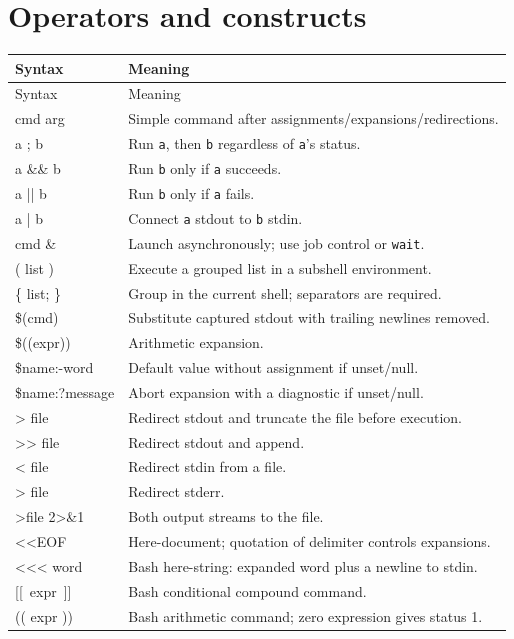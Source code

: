 \documentclass[11pt,oneside,openany]{book}
\begin{document}
\section{Operators and constructs}
\begin{longtable}{>{\ttfamily}p{}p{}}
\toprule
Syntax & Meaning \\
\midrule
\endfirsthead\toprule Syntax & Meaning \\
\midrule\endhead
cmd arg & Simple command after assignments/expansions/redirections. \\
a ; b & Run \texttt{a}, then \texttt{b} regardless of \texttt{a}'s status. \\
a \&\& b & Run \texttt{b} only if \texttt{a} succeeds. \\
a || b & Run \texttt{b} only if \texttt{a} fails. \\
a | b & Connect \texttt{a} stdout to \texttt{b} stdin. \\
cmd \& & Launch asynchronously; use job control or \texttt{wait}. \\
( list ) & Execute a grouped list in a subshell environment. \\
\{ list; \} & Group in the current shell; separators are required. \\
\$(cmd) & Substitute captured stdout with trailing newlines removed. \\
\$((expr)) & Arithmetic expansion. \\
\${name:-word} & Default value without assignment if unset/null. \\
\${name:?message} & Abort expansion with a diagnostic if unset/null. \\
> file & Redirect stdout and truncate the file before execution. \\
>> file & Redirect stdout and append. \\
< file & Redirect stdin from a file. \\
2> file & Redirect stderr. \\
>file 2>\&1 & Both output streams to the file. \\
<<EOF & Here-document; quotation of delimiter controls expansions. \\
<<< word & Bash here-string: expanded word plus a newline to stdin. \\
\mbox{[[ expr ]]} & Bash conditional compound command. \\
(( expr )) & Bash arithmetic command; zero expression gives status 1. \\
\bottomrule
\end{longtable}
\end{document}
